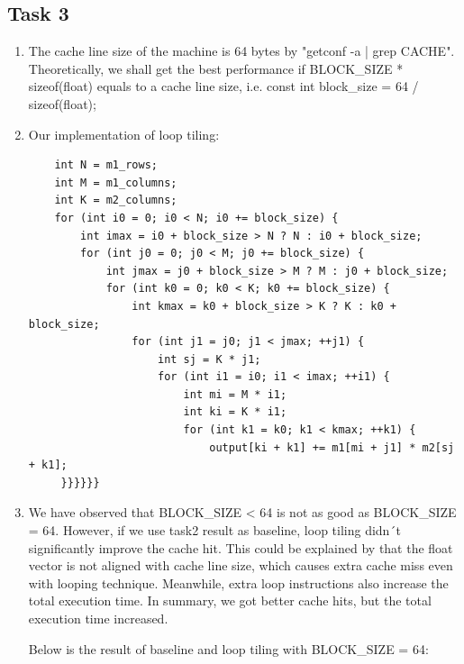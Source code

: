 \documentclass[a4paper, DIV12, headsepline]{scrartcl}
\begin{document}

\subsection*{Task 3}
\begin{enumerate}[label=\alph*)]
\item The cache line size of the machine is 64 bytes by "getconf -a | grep CACHE". Theoretically, we shall get the best performance if BLOCK\_SIZE * sizeof(float) equals to a cache line size, i.e. const int block\_size = 64 / sizeof(float);

\item Our implementation of loop tiling:
\begin{verbatim}  
    int N = m1_rows;
    int M = m1_columns;
    int K = m2_columns;
    for (int i0 = 0; i0 < N; i0 += block_size) {
        int imax = i0 + block_size > N ? N : i0 + block_size;
        for (int j0 = 0; j0 < M; j0 += block_size) {
            int jmax = j0 + block_size > M ? M : j0 + block_size;
            for (int k0 = 0; k0 < K; k0 += block_size) {
                int kmax = k0 + block_size > K ? K : k0 + block_size;
                for (int j1 = j0; j1 < jmax; ++j1) {
                    int sj = K * j1;
                    for (int i1 = i0; i1 < imax; ++i1) {
                        int mi = M * i1;
                        int ki = K * i1;
                        for (int k1 = k0; k1 < kmax; ++k1) {
                            output[ki + k1] += m1[mi + j1] * m2[sj + k1];
     }}}}}}
\end{verbatim}
\item We have observed that BLOCK\_SIZE < 64 is not as good as BLOCK\_SIZE = 64. However, if we use task2 result as baseline, loop tiling didn´t significantly improve the cache hit. This could be explained by that the float vector is not aligned with cache line size, which causes extra cache miss even with looping technique. Meanwhile, extra loop instructions also increase the total execution time. In summary, we got better cache hits, but the total execution time increased.


Below is the result of baseline and loop tiling with BLOCK\_SIZE = 64:


\end{enumerate}
\end{document}
